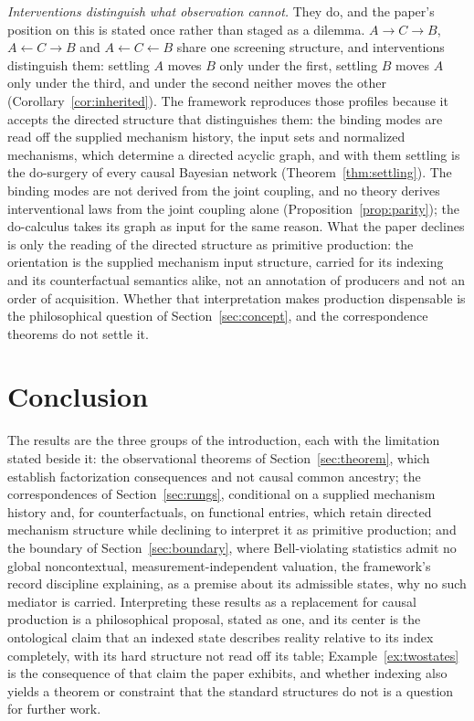 \documentclass[11pt]{article}
\begin{document}
\emph{Interventions distinguish what observation cannot.} They do, and the paper's position on this is stated once rather than staged as a dilemma. $A \to C \to B$, $A \leftarrow C \to B$ and $A \leftarrow C \leftarrow B$ share one screening structure, and interventions distinguish them: settling $A$ moves $B$ only under the first, settling $B$ moves $A$ only under the third, and under the second neither moves the other (Corollary~\ref{cor:inherited}). The framework reproduces those profiles because it accepts the directed structure that distinguishes them: the binding modes are read off the supplied mechanism history, the input sets and normalized mechanisms, which determine a directed acyclic graph, and with them settling is the do-surgery of every causal Bayesian network (Theorem~\ref{thm:settling}). The binding modes are not derived from the joint coupling, and no theory derives interventional laws from the joint coupling alone (Proposition~\ref{prop:parity}); the do-calculus takes its graph as input for the same reason. What the paper declines is only the reading of the directed structure as primitive production: the orientation is the supplied mechanism input structure, carried for its indexing and its counterfactual semantics alike, not an annotation of producers and not an order of acquisition. Whether that interpretation makes production dispensable is the philosophical question of Section~\ref{sec:concept}, and the correspondence theorems do not settle it.

\section{Conclusion} \label{sec:conclusion}

The results are the three groups of the introduction, each with the limitation stated beside it: the observational theorems of Section~\ref{sec:theorem}, which establish factorization consequences and not causal common ancestry; the correspondences of Section~\ref{sec:rungs}, conditional on a supplied mechanism history and, for counterfactuals, on functional entries, which retain directed mechanism structure while declining to interpret it as primitive production; and the boundary of Section~\ref{sec:boundary}, where Bell-violating statistics admit no global noncontextual, measurement-independent valuation, the framework's record discipline explaining, as a premise about its admissible states, why no such mediator is carried. Interpreting these results as a replacement for causal production is a philosophical proposal, stated as one, and its center is the ontological claim that an indexed state describes reality relative to its index completely, with its hard structure not read off its table; Example~\ref{ex:twostates} is the consequence of that claim the paper exhibits, and whether indexing also yields a theorem or constraint that the standard structures do not is a question for further work.
\end{document}
